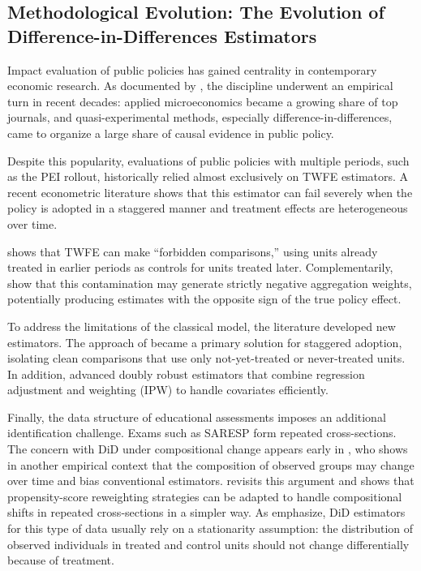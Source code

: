 \subsection{Methodological Evolution: The Evolution of Difference-in-Differences Estimators} \label{sec:diffindiff}

Impact evaluation of public policies has gained centrality in contemporary economic research. As documented by \textcite{currie2020}, the discipline underwent an empirical turn in recent decades: applied microeconomics became a growing share of top journals, and quasi-experimental methods, especially difference-in-differences, came to organize a large share of causal evidence in public policy.

Despite this popularity, evaluations of public policies with multiple periods, such as the PEI rollout, historically relied almost exclusively on TWFE estimators. A recent econometric literature shows that this estimator can fail severely when the policy is adopted in a staggered manner and treatment effects are heterogeneous over time.

\textcite{goodmanbacon} shows that TWFE can make ``forbidden comparisons,'' using units already treated in earlier periods as controls for units treated later. Complementarily, \textcite{chaisemartin2020} show that this contamination may generate strictly negative aggregation weights, potentially producing estimates with the opposite sign of the true policy effect.

To address the limitations of the classical model, the literature developed new estimators. The approach of \textcite{callawaysantanna} became a primary solution for staggered adoption, isolating clean comparisons that use only not-yet-treated or never-treated units. In addition, \textcite{santannazhao} advanced doubly robust estimators that combine regression adjustment and weighting (IPW) to handle covariates efficiently.

Finally, the data structure of educational assessments imposes an additional identification challenge. Exams such as SARESP form repeated cross-sections. The concern with DiD under compositional change appears early in \textcite{hong2013}, who shows in another empirical context that the composition of observed groups may change over time and bias conventional estimators. \textcite{murto2024} revisits this argument and shows that propensity-score reweighting strategies can be adapted to handle compositional shifts in repeated cross-sections in a simpler way. As \textcite{santannaxu} emphasize, DiD estimators for this type of data usually rely on a stationarity assumption: the distribution of observed individuals in treated and control units should not change differentially because of treatment.

